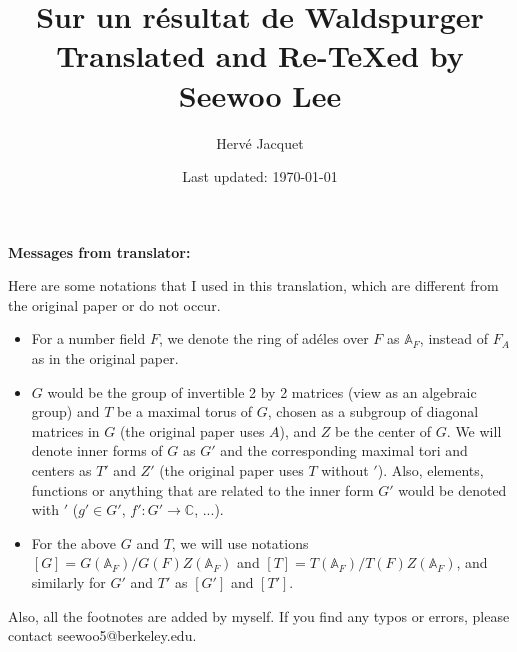 \documentclass[letterpaper, 12pt]{article}
\newcommand{\1}{\mathds{1}}	%
\newcommand{\Aa}{\mathbb{A}}
\theoremstyle{definition}
\numberwithin{equation}{subsection}
\numberwithin{theorem}{subsection}
\numberwithin{proposition}{section}
\numberwithin{lemma}{section}
\numberwithin{definition}{subsection}
\begin{document}

\title{Sur un r\'esultat de Waldspurger \\[1em]
\normalsize Translated and Re-\TeX ed by Seewoo Lee}


\author{Herv\'e Jacquet}
\date{\normalsize\vspace{-1ex} Last updated: \today}


\maketitle





\tableofcontents

\newpage

\textbf{Messages from translator:} 

Here are some notations that I used in this translation, which are different from the original paper or do not occur.

\begin{itemize}
    \item For a number field $F$, we denote the ring of ad\'eles over $F$ as $\Aa_F$, instead of $F_A$ as in the original paper.
    \item $G$ would be the group of invertible 2 by 2 matrices (view as an algebraic group) and $T$ be a maximal torus of $G$, chosen as a subgroup of diagonal matrices in $G$ (the original paper uses $A$), and $Z$ be the center of $G$.
    We will denote inner forms of $G$ as $G'$ and the corresponding maximal tori and centers as $T'$ and $Z'$ (the original paper uses $T$ without $'$).
    Also, elements, functions or anything that are related to the inner form $G'$ would be denoted with $'$ ($g' \in G'$, $f': G' \to \mathbb{C}$, ...).
    \item For the above $G$ and $T$, we will use notations $[G] = G(\Aa_F) / G(F)Z(\Aa_F)$ and $[T] = T(\Aa_F) / T(F) Z(\Aa_F)$, and similarly for $G'$ and $T'$ as $[G']$ and $[T']$.
\end{itemize}

Also, all the footnotes are added by myself.
If you find any typos or errors, please contact seewoo5@berkeley.edu.
\end{document}
